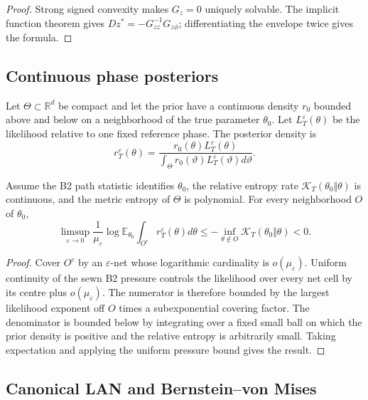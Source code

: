 \begin{proof}
Strong signed convexity makes \(G_z=0\) uniquely solvable.  The implicit
function theorem gives
\(Dz^*=-G_{zz}^{-1}G_{z\phi}\); differentiating the envelope twice gives the
formula.
\end{proof}

\subsection{Continuous phase posteriors}

Let \(\Theta\subset\mathbb R^d\) be compact and let the prior have a continuous
density \(r_0\) bounded above and below on a neighborhood of the true
parameter \(\theta_0\).  Let \(L_T^\varepsilon(\theta)\) be the likelihood
relative to one fixed reference phase.  The posterior density is
\[
 r_T^\varepsilon(\theta)=
 \frac{r_0(\theta)L_T^\varepsilon(\theta)}
      {\int_\Theta r_0(\vartheta)L_T^\varepsilon(\vartheta)d\vartheta}.
\]

\begin{theorem}
\label{thm:r5-c1-posterior-contraction}
Assume the B2 path statistic identifies \(\theta_0\), the relative entropy
rate \(\mathcal K_T(\theta_0\Vert\theta)\) is continuous, and the metric
entropy of \(\Theta\) is polynomial.  For every neighborhood \(O\) of
\(\theta_0\),
\[
 \limsup_{\varepsilon\to0}
 \frac1{\mu_\varepsilon}
 \log\mathbb E_{\theta_0}
 \int_{O^c}r_T^\varepsilon(\theta)d\theta
 \le-\inf_{\theta\notin O}
 \mathcal K_T(\theta_0\Vert\theta)<0.
\]
\end{theorem}

\begin{proof}
Cover \(O^c\) by an \(\varepsilon\)-net whose logarithmic cardinality is
\(o(\mu_\varepsilon)\).  Uniform continuity of the sewn B2 pressure controls
the likelihood over every net cell by its centre plus \(o(\mu_\varepsilon)\).
The numerator is therefore bounded by the largest likelihood exponent off
\(O\) times a subexponential covering factor.  The denominator is bounded
below by integrating over a fixed small ball on which the prior density is
positive and the relative entropy is arbitrarily small.  Taking expectation
and applying the uniform pressure bound gives the result.
\end{proof}

\subsection{Canonical LAN and Bernstein--von Mises}

